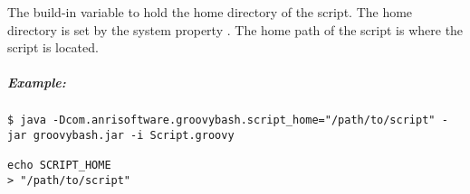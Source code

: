 \label{par:variable_script_home}

The  build-in variable to hold the home directory
of the script. The home directory is set by the
system property .
The home path of the script is where the script is located.

\subparagraph{Example:}

\begin{lstlisting}[style=Groovybash, label={lst:example_variable_script_home}]
$ java -Dcom.anrisoftware.groovybash.script_home="/path/to/script" -jar groovybash.jar -i Script.groovy

echo SCRIPT_HOME
> "/path/to/script"
\end{lstlisting}

